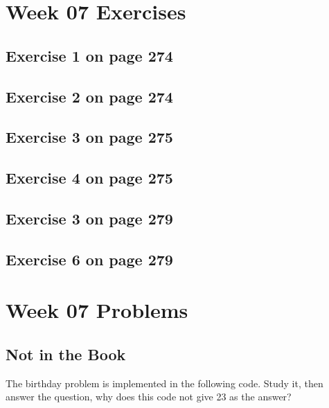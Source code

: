 \documentclass[12pt]{amsart}
\begin{document}
	
	\section{Week 07 Exercises}
	\subsection{ Exercise 1 on page 274} 
	\subsection{ Exercise 2 on page 274} 
	\subsection{Exercise 3 on page 275} 
	\subsection{Exercise 4 on page 275} 
	\subsection{Exercise 3 on page 279} 
	\subsection{Exercise 6 on page 279}
	
	
	\section{Week 07 Problems}
	\subsection{Not in the Book}
	The birthday problem is implemented in the following code. Study it, then
	answer the question, why does this code not give 23 as the answer?
	
	
\end{document}
